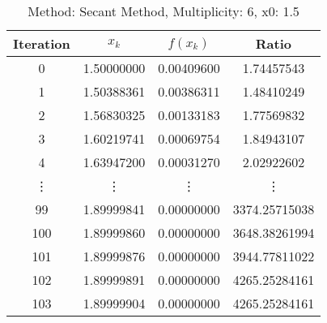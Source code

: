 \begin{table}
\centering
\caption{Method: Secant Method, Multiplicity: 6, x0: 1.5}
\label{tab:table_Secant_Method_6_1_5}
\begin{tabular}{c c c c}
\toprule
Iteration &      $x_k$ &   $f(x_k)$ &         Ratio \\
\midrule
        0 & 1.50000000 & 0.00409600 &    1.74457543 \\
        1 & 1.50388361 & 0.00386311 &    1.48410249 \\
        2 & 1.56830325 & 0.00133183 &    1.77569832 \\
        3 & 1.60219741 & 0.00069754 &    1.84943107 \\
        4 & 1.63947200 & 0.00031270 &    2.02922602 \\
   \vdots &     \vdots &     \vdots &        \vdots \\
       99 & 1.89999841 & 0.00000000 & 3374.25715038 \\
      100 & 1.89999860 & 0.00000000 & 3648.38261994 \\
      101 & 1.89999876 & 0.00000000 & 3944.77811022 \\
      102 & 1.89999891 & 0.00000000 & 4265.25284161 \\
      103 & 1.89999904 & 0.00000000 & 4265.25284161 \\
\bottomrule
\end{tabular}
\end{table}
